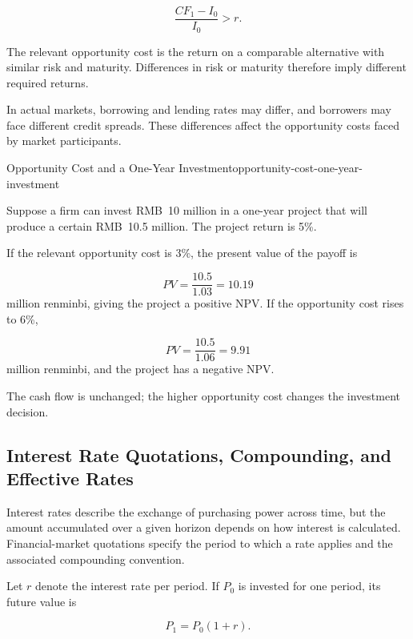 \begin{equation*}
\frac{CF_1-I_0}{I_0}>r.
\label{eq:ch6-return-hurdle-simple}
\end{equation*}

The relevant opportunity cost is the return on a comparable alternative with similar risk and maturity. Differences in risk or maturity therefore imply different required returns.

In actual markets, borrowing and lending rates may differ, and borrowers may face different credit spreads. These differences affect the opportunity costs faced by market participants.

\begin{example}{Opportunity Cost and a One-Year Investment}{opportunity-cost-one-year-investment}

Suppose a firm can invest RMB~10 million in a one-year project that will produce a certain RMB~10.5 million. The project return is 5\%.

If the relevant opportunity cost is 3\%, the present value of the payoff is

$$
PV=\frac{10.5}{1.03}=10.19
$$
million renminbi, giving the project a positive NPV. If the opportunity cost rises to 6\%,

$$
PV=\frac{10.5}{1.06}=9.91
$$
million renminbi, and the project has a negative NPV.

The cash flow is unchanged; the higher opportunity cost changes the investment decision.

\end{example}



\subsection{Interest Rate Quotations, Compounding, and Effective Rates}

Interest rates describe the exchange of purchasing power across time, but the amount accumulated over a given horizon depends on how interest is calculated. Financial-market quotations specify the period to which a rate applies and the associated compounding convention.

Let $r$ denote the interest rate per period. If $P_0$ is invested for one period, its future value is

\begin{equation}
P_1=P_0(1+r).
\label{eq:ch6-one-period-growth}
\end{equation}

